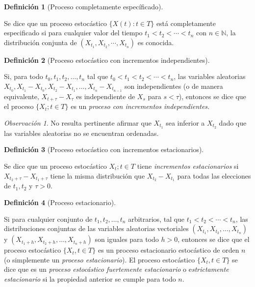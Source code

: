 \documentclass[
  us-letterpaper,
]{scrreprt}
\theoremstyle{plain}
\theoremstyle{definition}
\theoremstyle{plain}
\theoremstyle{definition}
\newtheorem{definition}{Definición}[chapter]
\theoremstyle{remark}
\newtheorem*{remark}{Observación}
\begin{document}
\begin{definition}[Proceso completamente
específicado]\protect\hypertarget{def-pcesp}{}\label{def-pcesp}

Se dice que un proceso estocástico \(\{X(t):t\in T\}\) está
completamente especificado si para cualquier valor del tiempo
\(t_1<t_2<\cdots<t_n\) con \(n\in\mathbb N\), la distribución conjunta
de \((X_{t_1}, X_{t_2},\cdots,X_{t_n})\) es conocida.

\end{definition}

\begin{definition}[Proceso estocástico con incrementos
independientes]\protect\hypertarget{def-incind}{}\label{def-incind}

Si, para todo \(t_0,t_1,t_2,\ldots,t_n\) tal que
\(t_0<t_1<t_2<\cdots<t_n\), las variables aleatorias
\(X_{t_0}, X_{t_1}-X_{t_0}, X_{t_2}-X_{t_1},\ldots,X_{t_n}-X_{t_{n-1}}\)
son independientes (o de manera equivalente, \(X_{t+\tau}-X_\tau\) es
independiente de \(X_s\) para \(s< \tau\)), entonces se dice que el
proceso \(\{X_t; t\in T\}\) es un \emph{proceso con incrementos
independientes.}

\end{definition}

\begin{remark}
No resulta pertinente afirmar que \(X_{t_1}\) sea inferior a \(X_{t_2}\)
dado que las variables aleatorias no se encuentran ordenadas.
\end{remark}

\begin{definition}[Proceso estocástico con incrementos
estacionarios]\protect\hypertarget{def-incest}{}\label{def-incest}

Se dice que un proceso estocástico \({X_t; t\in T}\) tiene
\emph{incrementos estacionarios} si \(X_{t_2+\tau}-X_{t_1+\tau}\) tiene
la misma distribución que \(X_{t_2}-X_{t_1}\) para todas las elecciones
de \(t_1,t_2\) y \(\tau>0\).

\end{definition}

\begin{definition}[Proceso
estacionario]\protect\hypertarget{def-procesoest}{}\label{def-procesoest}

Si para cualquier conjunto de \(t_1, t_2, \ldots , t_n\) arbitrarios,
tal que \(t_1< t_2 < \cdots < t_n\), las distribuciones conjuntas de las
variables aleatorias vectoriales \((X_{t_1}, X_{t_2},\ldots, X_{t_n})\)
y \((X_{t_1+h}, X_{t_2+h},\ldots , X_{t_n+h})\) son iguales para todo
\(h > 0\), entonces se dice que el proceso estocástico
\(\{X_t, t \in T\}\) es un proceso estacionario estocástico de orden
\(n\) (o simplemente un \emph{proceso estacionario}). El proceso
estocástico \(\{X_t, t \in T\}\) se dice que es un \emph{proceso
estocástico fuertemente estacionario} o e\emph{strictamente
estacionario} si la propiedad anterior se cumple para todo \(n\).

\end{definition}
\end{document}
